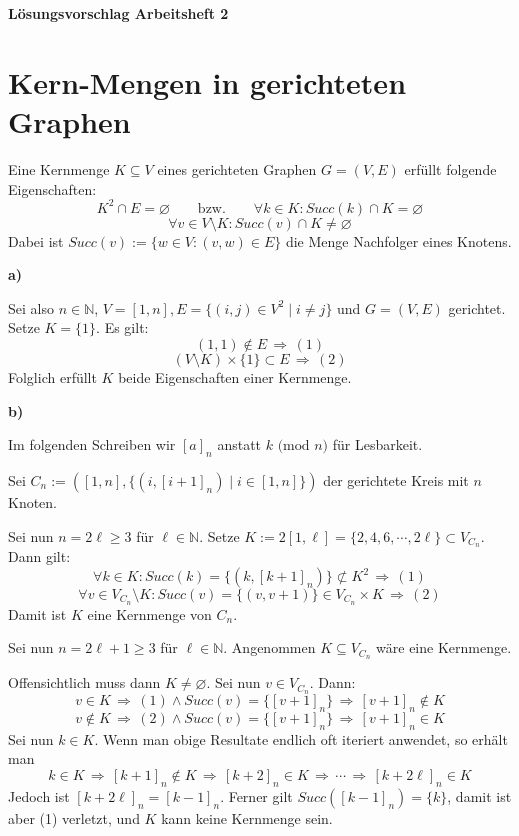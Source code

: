 \documentclass[a4paper,graphics,11pt]{article}
\begin{document}
\begin{center}
    \LARGE \textbf{Lösungsvorschlag Arbeitsheft 2}
\end{center}

\section{Kern-Mengen in gerichteten Graphen}

Eine Kernmenge $K \subseteq V$ eines gerichteten Graphen $G = (V,E)$ erfüllt folgende Eigenschaften:
\begin{equation}
    K^2 \cap E = \varnothing
    \qquad\text{bzw.}\qquad
    \forall k \in K: Succ(k) \cap K = \varnothing
\end{equation}
\begin{equation}
    \forall v \in V \setminus K: Succ(v) \cap K \neq \varnothing
\end{equation}
Dabei ist $Succ(v) := \{w \in V: (v,w) \in E\}$ die Menge Nachfolger eines Knotens.


\textbf{a)}

Sei also $n \in \mathbb{N}$, $V = [1,n], E = \{(i,j) \in V^2 \mid i \neq j\}$ und $G = (V,E)$ gerichtet.\\
Setze $K = \{1\}$. Es gilt:
$$
    (1,1) \notin E \,\Longrightarrow\, (1)
$$
$$
    (V\setminus K) \times \{1\} \subset E \,\Longrightarrow\, (2)
$$
Folglich erfüllt $K$ beide Eigenschaften einer Kernmenge.

\strut

\textbf{b)}

Im folgenden Schreiben wir $[a]_n$ anstatt $k \text{ (mod $n$)}$ für Lesbarkeit.

Sei $C_n := ([1,n], \{(i, [i+1]_n) \mid i \in [1,n]\})$ der gerichtete Kreis mit $n$ Knoten.

Sei nun $n = 2\ell \geq 3$ für $\ell \in \mathbb{N}$. Setze $K := 2[1,\ell] = \{2,4,6,\cdots,2\ell\} \subset V_{C_n}$. Dann gilt:
$$
    \forall k \in K: Succ(k) = \{(k, [k+1]_n)\} \not\subset K^2 \,\Longrightarrow\, (1)
$$
$$
    \forall v \in V_{C_n}\setminus K: Succ(v) = \{(v, v+1)\} \in V_{C_n} \times K \,\Longrightarrow\, (2)
$$
Damit ist $K$ eine Kernmenge von $C_n$.

Sei nun $n = 2\ell+1 \geq 3$ für $\ell \in \mathbb{N}$. Angenommen $K \subseteq V_{C_n}$ wäre eine Kernmenge.

Offensichtlich muss dann $K \neq \varnothing$. Sei nun $v \in V_{C_n}$. Dann:
$$
    v \in K \,\Longrightarrow\, (1) \land Succ(v) = \{[v+1]_n\} \,\Longrightarrow\, [v+1]_n \notin K
$$
$$
    v \notin K \,\Longrightarrow\, (2) \land Succ(v) = \{[v+1]_n\} \,\Longrightarrow\, [v+1]_n \in K
$$
Sei nun $k \in K$. Wenn man obige Resultate endlich oft iteriert anwendet, so erhält man
$$
    k \in K
    \,\Longrightarrow\, [k+1]_n \notin K
    \,\Longrightarrow\, [k+2]_n \in K
    \,\Longrightarrow\, \cdots
    \,\Longrightarrow\, [k+2\ell]_n \in K
$$
Jedoch ist $[k+2\ell]_n = [k-1]_n$. Ferner gilt $Succ([k-1]_n) = \{k\}$, damit
ist aber (1) verletzt, und $K$ kann keine Kernmenge sein.
\end{document}
